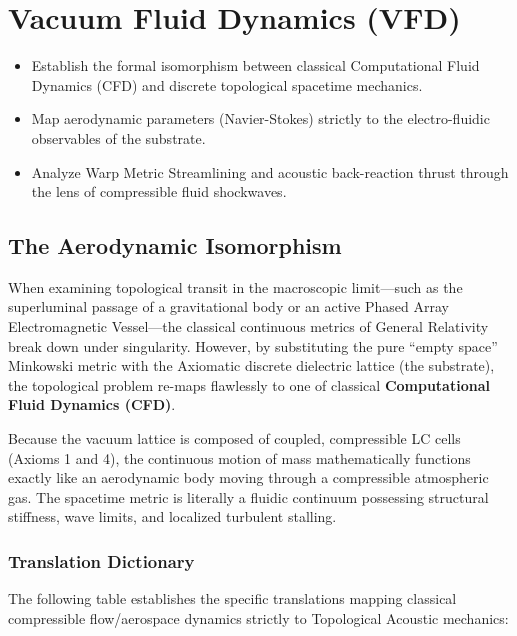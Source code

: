 \chapter{Vacuum Fluid Dynamics (VFD)}
\label{ch:vacuum_fluid_dynamics}

\begin{objectivebox}
\begin{itemize}
    \item Establish the formal isomorphism between classical Computational Fluid Dynamics (CFD) and discrete topological spacetime mechanics.
    \item Map aerodynamic parameters (Navier-Stokes) strictly to the electro-fluidic observables of the substrate.
    \item Analyze Warp Metric Streamlining and acoustic back-reaction thrust through the lens of compressible fluid shockwaves.
\end{itemize}
\end{objectivebox}

\section{The Aerodynamic Isomorphism}

When examining topological transit in the macroscopic limit---such as the superluminal passage of a gravitational body or an active Phased Array Electromagnetic Vessel---the classical continuous metrics of General Relativity break down under singularity. However, by substituting the pure ``empty space'' Minkowski metric with the Axiomatic discrete dielectric lattice (the substrate), the topological problem re-maps flawlessly to one of classical \textbf{Computational Fluid Dynamics (CFD)}.

Because the vacuum lattice is composed of coupled, compressible LC cells (Axioms 1 and 4), the continuous motion of mass mathematically functions exactly like an aerodynamic body moving through a compressible atmospheric gas. The spacetime metric is literally a fluidic continuum possessing structural stiffness, wave limits, and localized turbulent stalling.

\subsection{Translation Dictionary}
The following table establishes the specific translations mapping classical compressible flow/aerospace dynamics strictly to Topological Acoustic mechanics:

